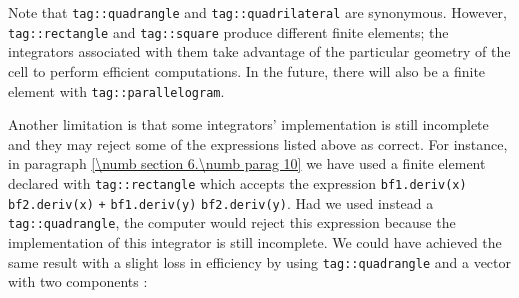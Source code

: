 Note that {\small\tt\textcolor{tag}{tag}::quadrangle} and
{\small\tt\textcolor{tag}{tag}::quadrilateral} are synonymous.
However, {\small\tt\textcolor{tag}{tag}::rectangle} and {\small\tt\textcolor{tag}{tag}::square}
produce different finite elements; the integrators associated with them take advantage of
the particular geometry of the cell to perform efficient computations.
In the future, there will also be a finite element with
{\small\tt\textcolor{tag}{tag}::parallelogram}.

Another limitation is that some integrators' implementation is still incomplete and they may
reject some of the expressions listed above as correct.
For instance, in paragraph \ref{\numb section 6.\numb parag 10} we have used a finite element
declared with {\small\tt\textcolor{tag}{tag}::rectangle} which accepts the expression
{\small\tt bf1.deriv(x)} {\small\tt *} {\small\tt bf2.deriv(x)}
{\small\tt +} {\small\tt bf1.deriv(y)} {\small\tt *} {\small\tt bf2.deriv(y)}.
Had we used instead a {\small\tt\textcolor{tag}{tag}::quadrangle}, the computer would
reject this expression because the implementation of this integrator is still incomplete.
We could have achieved the same result with a slight loss in efficiency by using
{\small\tt\textcolor{tag}{tag}::quadrangle} and a vector {\small\tt{}} with two
components :

